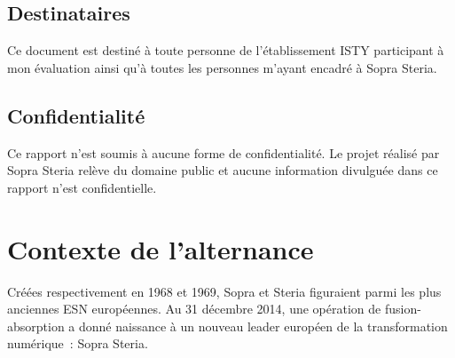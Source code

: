 \documentclass[12pt,a4paper]{article}
\begin{document}
\subsection{Destinataires}
Ce document est destiné à toute personne de l'établissement ISTY participant à mon évaluation ainsi qu'à toutes les personnes m'ayant encadré à Sopra Steria.
\smallbreak
\subsection{Confidentialité}
Ce rapport n'est soumis à aucune forme de confidentialité. Le projet réalisé par Sopra Steria relève du domaine public et aucune information divulguée dans ce rapport n'est confidentielle.
\smallbreak
\section{Contexte de l'alternance}
Créées respectivement en 1968 et 1969, Sopra et Steria figuraient parmi les plus anciennes \gls{ESN} européennes. Au 31 décembre 2014, une opération de fusion-absorption a donné naissance à un nouveau leader européen de la transformation numérique~: Sopra Steria.
\end{document}
